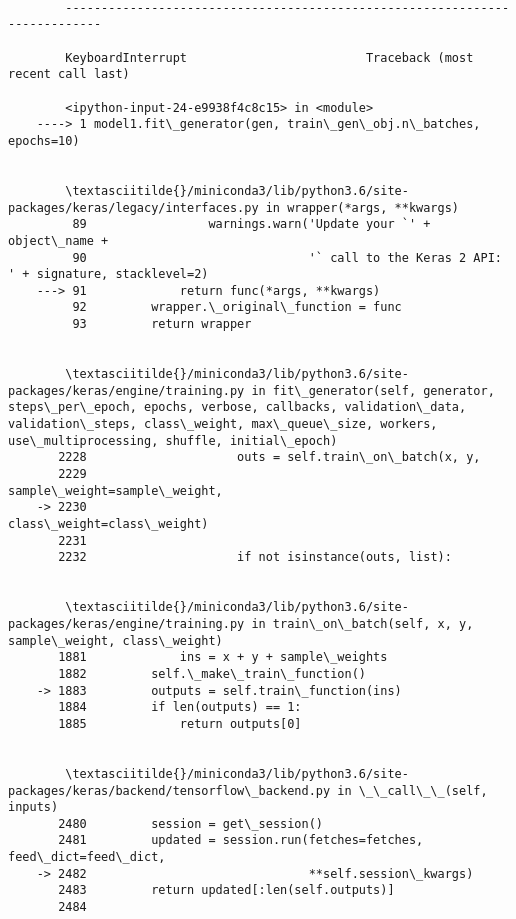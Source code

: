 \documentclass[11pt]{article}
\begin{document}
    \begin{Verbatim}[commandchars=\\\{\}]

        ---------------------------------------------------------------------------

        KeyboardInterrupt                         Traceback (most recent call last)

        <ipython-input-24-e9938f4c8c15> in <module>
    ----> 1 model1.fit\_generator(gen, train\_gen\_obj.n\_batches, epochs=10)
    

        \textasciitilde{}/miniconda3/lib/python3.6/site-packages/keras/legacy/interfaces.py in wrapper(*args, **kwargs)
         89                 warnings.warn('Update your `' + object\_name +
         90                               '` call to the Keras 2 API: ' + signature, stacklevel=2)
    ---> 91             return func(*args, **kwargs)
         92         wrapper.\_original\_function = func
         93         return wrapper


        \textasciitilde{}/miniconda3/lib/python3.6/site-packages/keras/engine/training.py in fit\_generator(self, generator, steps\_per\_epoch, epochs, verbose, callbacks, validation\_data, validation\_steps, class\_weight, max\_queue\_size, workers, use\_multiprocessing, shuffle, initial\_epoch)
       2228                     outs = self.train\_on\_batch(x, y,
       2229                                                sample\_weight=sample\_weight,
    -> 2230                                                class\_weight=class\_weight)
       2231 
       2232                     if not isinstance(outs, list):


        \textasciitilde{}/miniconda3/lib/python3.6/site-packages/keras/engine/training.py in train\_on\_batch(self, x, y, sample\_weight, class\_weight)
       1881             ins = x + y + sample\_weights
       1882         self.\_make\_train\_function()
    -> 1883         outputs = self.train\_function(ins)
       1884         if len(outputs) == 1:
       1885             return outputs[0]


        \textasciitilde{}/miniconda3/lib/python3.6/site-packages/keras/backend/tensorflow\_backend.py in \_\_call\_\_(self, inputs)
       2480         session = get\_session()
       2481         updated = session.run(fetches=fetches, feed\_dict=feed\_dict,
    -> 2482                               **self.session\_kwargs)
       2483         return updated[:len(self.outputs)]
       2484 



\end{Verbatim}
\end{document}

